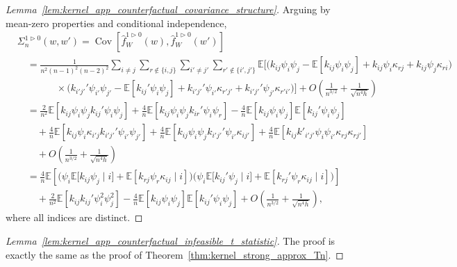 \documentclass[11pt,lof]{puthesis}
\newcommand{\E}{\ensuremath{\mathbb{E}}}
\DeclareMathOperator{\Cov}{Cov}
\theoremstyle{break}
\theoremstyle{proof}
\newtheorem{proof}{Proof}
\begin{document}
\begin{proof}[Lemma~\ref{lem:kernel_app_counterfactual_covariance_structure}]

Arguing by mean-zero properties and conditional independence,
%
\begin{align*}
&\Sigma_n^{1 \triangleright 0}(w,w')
= \Cov\left[
\hat f_W^{1 \triangleright 0}(w),
\hat f_W^{1 \triangleright 0}(w')
\right] \\
&\quad=
\frac{1}{n^2(n-1)^2(n-2)^2}
\sum_{i \neq j}
\sum_{r \notin \{i,j\}}
\sum_{i' \neq j'}
\sum_{r' \notin \{i',j'\}}
\!\!\!\!\E\Big[
\!\Big(
k_{i j} \psi_i \psi_j
- \E[k_{i j} \psi_i \psi_j]
+ k_{i j}\psi_i \kappa_{r j}
+ k_{i j}\psi_j \kappa_{r i}
\Big) \\
&\qquad\qquad\times
\Big(
k_{i' j'}' \psi_{i'} \psi_{j'}
- \E[k_{i j}' \psi_i \psi_j]
+ k_{i' j'}'\psi_{i'} \kappa_{r' j'}
+ k_{i' j'}'\psi_{j'} \kappa_{r' i'}
\Big)
\Big]
+ O\left( \frac{1}{n^{3/2}} + \frac{1}{\sqrt{n^4h}} \right) \\
&\quad=
\frac{2}{n^2}
\E\left[
k_{i j} \psi_i \psi_j
k_{i j}' \psi_i \psi_j
\right]
+ \frac{4}{n}
\E\left[
k_{i j} \psi_i \psi_j
k_{i r}' \psi_i \psi_r
\right]
- \frac{4}{n}
\E\left[
k_{i j} \psi_i \psi_j
\right]
\E\left[
k_{i j}' \psi_i \psi_j
\right] \\
&\qquad+
\frac{4}{n}
\E\left[
k_{i j}\psi_i \kappa_{i' j}
k_{i' j'}' \psi_{i'} \psi_{j'}
\right]
+ \frac{4}{n}
\E\left[
k_{i j} \psi_{i} \psi_{j}
k_{i' j'}'\psi_{i'} \kappa_{i j'}
\right]
+ \frac{4}{n}
\E\left[
k_{i j} k'_{i' j'}
\psi_i \psi_{i'}
\kappa_{r j} \kappa_{r j'}
\right] \\
&\qquad+
O\left( \frac{1}{n^{3/2}} + \frac{1}{\sqrt{n^4h}} \right) \\
&\quad=
\frac{4}{n}
\E\left[
\Big(
\psi_i
\E\big[
k_{i j} \psi_j
\mid i
\big]
+ \E\left[
k_{r j} \psi_r \kappa_{i j}
\mid i
\right]
\Big)
\Big(
\psi_i
\E\big[
k_{i j}' \psi_j
\mid i
\big]
+ \E\left[
k_{r j}' \psi_r \kappa_{i j}
\mid i
\right]
\Big)
\right] \\
&\qquad+
\frac{2}{n^2}
\E\left[
k_{i j} k_{i j}'
\psi_i^2 \psi_j^2
\right]
- \frac{4}{n}
\E\left[
k_{i j} \psi_i \psi_j
\right]
\E\left[
k_{i j}' \psi_i \psi_j
\right]
+ O\left( \frac{1}{n^{3/2}} + \frac{1}{\sqrt{n^4h}} \right),
\end{align*}
%
where all indices are distinct.
%
\end{proof}

\begin{proof}[Lemma~\ref{lem:kernel_app_counterfactual_infeasible_t_statistic}]
The proof is exactly the same as the proof of
Theorem~\ref{thm:kernel_strong_approx_Tn}.
\end{proof}
\end{document}
